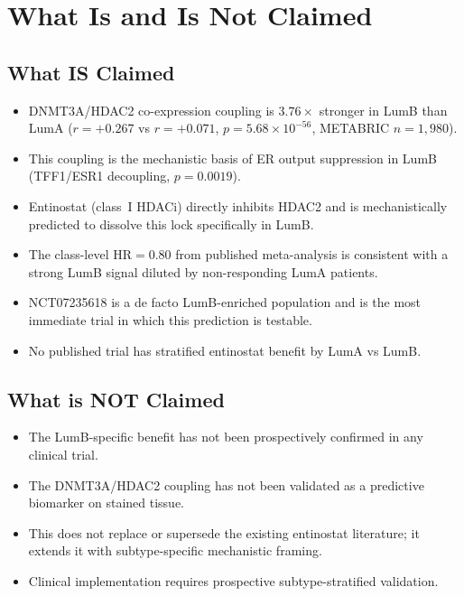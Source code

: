 \documentclass[12pt, a4paper]{article}
\begin{document}
\section{What Is and Is Not Claimed}

\subsection{What IS Claimed}

\begin{itemize}
    \item DNMT3A/HDAC2 co-expression coupling is
    $3.76\times$ stronger in LumB than LumA
    ($r=+0.267$ vs $r=+0.071$,
    $p=5.68\times10^{-56}$, METABRIC $n=1{,}980$).
    \item This coupling is the mechanistic basis of
    ER output suppression in LumB (TFF1/ESR1
    decoupling, $p=0.0019$).
    \item Entinostat (class~I HDACi) directly
    inhibits HDAC2 and is mechanistically predicted
    to dissolve this lock specifically in LumB.
    \item The class-level HR$=0.80$ from published
    meta-analysis is consistent with a strong LumB
    signal diluted by non-responding LumA patients.
    \item NCT07235618 is a de facto LumB-enriched
    population and is the most immediate trial in
    which this prediction is testable.
    \item No published trial has stratified
    entinostat benefit by LumA vs LumB.
\end{itemize}

\subsection{What is NOT Claimed}

\begin{itemize}
    \item The LumB-specific benefit has not been
    prospectively confirmed in any clinical trial.
    \item The DNMT3A/HDAC2 coupling has not been
    validated as a predictive biomarker on stained
    tissue.
    \item This does not replace or supersede the
    existing entinostat literature; it extends
    it with subtype-specific mechanistic framing.
    \item Clinical implementation requires
    prospective subtype-stratified validation.
\end{itemize}
\end{document}
